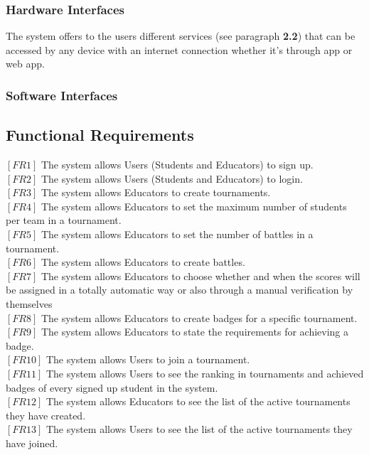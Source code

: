 \documentclass{article}
\begin{document}
\subsubsection{Hardware Interfaces}

The system offers to the users different services (see paragraph \textbf{2.2}) that can be accessed by any device with an internet connection whether it's through app or web app.
                            
\subsubsection{Software Interfaces}



\subsection{Functional Requirements}
$[FR1]$ The system allows Users (Students and Educators) to sign up.\\
$[FR2]$ The system allows Users (Students and Educators) to login.\\
$[FR3]$ The system allows Educators to create tournaments.\\
$[FR4]$ The system allows Educators to set the maximum number of students per team in a tournament.\\
$[FR5]$ The system allows Educators to set the number of battles in a tournament.\\
$[FR6]$ The system allows Educators to create battles.\\
$[FR7]$ The system allows Educators to choose whether and when the scores will be assigned in a totally automatic way or also through a manual verification by themselves\\
$[FR8]$ The system allows Educators to create badges for a specific tournament.\\
$[FR9]$ The system allows Educators to state the requirements for achieving a badge.\\
$[FR10]$ The system allows Users to join a tournament.\\
$[FR11]$ The system allows Users to see the ranking in tournaments and achieved badges of every signed up student in the system.\\
$[FR12]$ The system allows Educators to see the list of the active tournaments they have created.\\
$[FR13]$ The system allows Users to see the list of the active tournaments they have joined.\\
\end{document}
